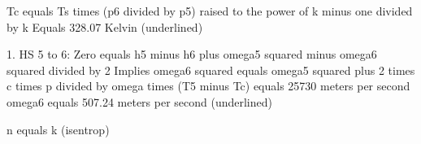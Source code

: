 Tc equals Ts times (p6 divided by p5) raised to the power of k minus one divided by k  
Equals 328.07 Kelvin (underlined)

1. HS 5 to 6:  
Zero equals h5 minus h6 plus omega5 squared minus omega6 squared divided by 2  
Implies omega6 squared equals omega5 squared plus 2 times c times p divided by omega times (T5 minus Tc) equals 25730 meters per second  
omega6 equals 507.24 meters per second (underlined)

n equals k (isentrop)